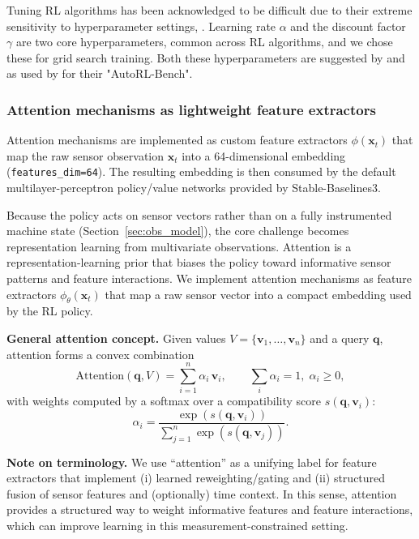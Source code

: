 \documentclass[sn-basic]{sn-jnl} %
\begin{document}
Tuning RL algorithms has been acknowledged to be difficult due to their extreme sensitivity to hyperparameter settings, \cite{Henderson2019}. Learning rate $\alpha$ and the discount factor $\gamma$ are two core hyperparameters, common across RL algorithms, and we chose these for grid search training. Both these hyperparameters are suggested by \cite{Shala2022AutoRL, Eimer2023, Francois2016} and as used by \cite{Shala2022AutoRL} for their "AutoRL-Bench".


\subsubsection{Attention mechanisms as lightweight feature extractors}
\label{sec:attention}

Attention mechanisms are implemented as custom feature extractors $\phi(\mathbf{x}_t)$ that map the raw sensor observation $\mathbf{x}_t$ into a 64-dimensional embedding (\texttt{features\_dim=64}). The resulting embedding is then consumed by the default multilayer-perceptron policy/value networks provided by Stable-Baselines3.

Because the policy acts on sensor vectors rather than on a fully instrumented machine state (Section~\ref{sec:obs_model}), the core challenge becomes representation learning from multivariate observations. Attention is a representation-learning prior that biases the policy toward informative sensor patterns and feature interactions. We implement attention mechanisms as feature extractors $\phi_\theta(\mathbf{x}_t)$ that map a raw sensor vector into a compact embedding used by the RL policy.

\textbf{General attention concept.}
Given values $V=\{\mathbf{v}_1,\ldots,\mathbf{v}_n\}$ and a query $\mathbf{q}$, attention forms a convex combination
\begin{equation}
\mathrm{Attention}(\mathbf{q},V)=\sum_{i=1}^{n}\alpha_i\,\mathbf{v}_i,\qquad \sum_i\alpha_i=1,\;\alpha_i\ge 0,
\end{equation}
with weights computed by a softmax over a compatibility score $s(\mathbf{q},\mathbf{v}_i)$:
\begin{equation}
\alpha_i = \frac{\exp(s(\mathbf{q},\mathbf{v}_i))}{\sum_{j=1}^n\exp(s(\mathbf{q},\mathbf{v}_j))}.
\end{equation}

\textbf{Note on terminology.}
We use ``attention'' as a unifying label for feature extractors that implement (i) learned reweighting/gating and (ii) structured fusion of sensor features and (optionally) time context. In this sense, attention provides a structured way to weight informative features and feature interactions, which can improve learning in this measurement-constrained setting.
\end{document}
